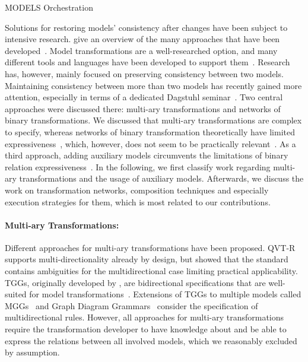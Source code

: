 \begin{copiedFrom}{MODELS Orchestration}

Solutions for restoring models’ consistency after changes have been subject to intensive research. \citeauthor{macedo2017ModelRepairClassification-TSE} give an overview of the many approaches that have been developed~\cite{macedo2017ModelRepairClassification-TSE}.
Model transformations are a well-researched option, and many different tools and languages have been developed to support them~\cite{stevens2008LandscapeBidirectionalTransformation-GTTSE, etzlstorfer2013SurveyIncrementalTransformation-ME, samimi-dehkordi2016iccke}.
Research has, however, mainly focused on preserving consistency between two models.
Maintaining consistency between more than two models has recently gained more attention, especially in terms of a dedicated Dagstuhl seminar~\cite{cleve2019dagstuhl}.
Two central approaches were discussed there: multi-ary transformations and networks of binary transformations.
We discussed that multi-ary transformations are complex to specify, whereas networks of binary transformation theoretically have limited expressiveness~\cite{stevens2020BidirectionalTransformationLarge-SoSym}, which, however, does not seem to be practically relevant~\cite{cleve2019dagstuhl}.
As a third approach, adding auxiliary models circumvents the limitations of binary relation expressiveness~\cite{diskin2018MultiModelSynchronization-FASE}.
In the following, we first classify work regarding multi-ary transformations and the usage of auxiliary models. Afterwards, we discuss the work on transformation networks, composition techniques and especially execution strategies for them, which is most related to our contributions.

\paragraph{Multi-ary Transformations:}
Different approaches for multi-ary transformations have been proposed. QVT-R~\cite{qvt} supports multi-directionality already by design, but \textcite{macedo2014FrameworkMultiDirectional-BX} showed that the standard contains ambiguities for the multidirectional case limiting practical applicability.
\glspl{TGG}, originally developed by \textcite{schuerr1995a}, are bidirectional specifications that are well-suited for model transformations~\cite{anjorin2014EfficientSynchronizationTGG-ECMFA}. 
Extensions of \glspl{TGG} to multiple models called \glspl{MGG}~\cite{konigs2006sosym} and Graph Diagram Grammars~\cite{trollmann2015TransformationTGGtoMultiModel-ICMT, trollmann2016SynchronizationTGGtoMultiModel-ICMT} consider the specification of multidirectional rules.
However, all approaches for multi-ary transformations require the transformation developer to have knowledge about and be able to express the relations between all involved models, which we reasonably excluded by assumption.


\end{copiedFrom}
